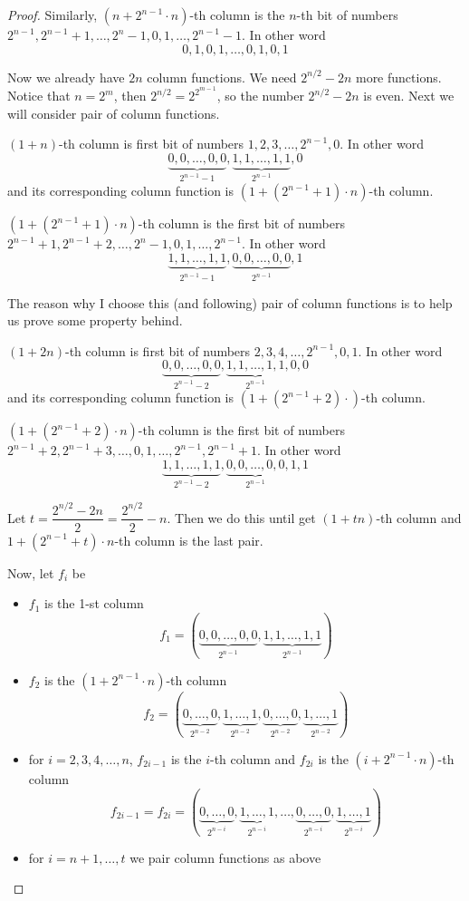\documentclass{article}
\begin{document}
\begin{proof}
    Similarly, $(n+2^{n-1} \cdot n)$-th column is the $n$-th bit of numbers $2^{n-1}, 2^{n-1}+1, \ldots, 2^n-1, 0, 1, \ldots, 2^{n-1}-1$. In other word \[ 0, 1, 0, 1, \ldots, 0, 1, 0, 1 \]

    Now we already have $2n$ column functions. We need $2^{n/2}-2n$ more functions. Notice that $n=2^m$, then $2^{n/2} = 2^{2^{m-1}}$, so the number $2^{n/2}-2n$ is even. Next we will consider pair of column functions.

    $(1+n)$-th column is first bit of numbers $1, 2, 3, \ldots, 2^{n-1}, 0$. In other word \[ \underbrace{0, 0, \ldots, 0, 0}_{2^{n-1}-1}, \underbrace{1, 1, \ldots, 1, 1}_{2^{n-1}}, 0 \] and its corresponding column function is $(1 + (2^{n-1}+1) \cdot n)$-th column.

    $(1 + (2^{n-1} + 1) \cdot n)$-th column is the first bit of numbers $2^{n-1}+1, 2^{n-1}+2, \ldots, 2^n-1, 0, 1, \ldots, 2^{n-1}$. In other word \[ \underbrace{1, 1, \ldots, 1, 1}_{2^{n-1}-1}, \underbrace{0, 0, \ldots, 0, 0}_{2^{n-1}}, 1 \]

    The reason why I choose this (and following) pair of column functions is to help us prove some property behind.

    $(1 + 2n)$-th column is first bit of numbers $2, 3, 4, \ldots, 2^{n-1}, 0, 1$. In other word \[ \underbrace{0, 0, \ldots, 0, 0}_{2^{n-1}-2}, \underbrace{1, 1, \ldots, 1, 1}_{2^{n-1}}, 0, 0 \] and its corresponding column function is $(1 + (2^{n-1} + 2) \cdot)$-th column.

    $(1 + (2^{n-1}+2) \cdot n)$-th column is the first bit of numbers $2^{n-1}+2, 2^{n-1}+3, \ldots, 0, 1, \ldots, 2^{n-1}, 2^{n-1}+1$. In other word \[ \underbrace{1, 1, \ldots, 1, 1}_{2^{n-1}-2}, \underbrace{0, 0, \ldots, 0, 0}_{2^{n-1}}, 1, 1 \]

    Let $t = \dfrac{2^{n/2} - 2n}{2} = \dfrac{2^{n/2}}{2} - n$. Then we do this until get $(1 + tn)$-th column and $1 + (2^{n-1}+t) \cdot n$-th column is the last pair.

    Now, let $f_i$ be

    \begin{itemize}
        \item $f_1$ is the 1-st column \[ f_1 = (\underbrace{0, 0, \ldots, 0, 0}_{2^{n-1}}, \underbrace{1, 1, \ldots, 1, 1}_{2^{n-1}}) \]
        \item $f_2$ is the $(1 + 2^{n-1} \cdot n)$-th column \[ f_2 = (\underbrace{0, \ldots, 0}_{2^{n-2}}, \underbrace{1, \ldots, 1}_{2^{n-2}}, \underbrace{0, \ldots, 0}_{2^{n-2}}, \underbrace{1, \ldots, 1}_{2^{n-2}}) \]
        \item for $i = 2, 3, 4, \ldots, n$, $f_{2i-1}$ is the $i$-th column and $f_{2i}$ is the $(i + 2^{n-1} \cdot n)$-th column \[ f_{2i-1} = f_{2i} = (\underbrace{0, \ldots, 0}_{2^{n-i}}, \underbrace{1, \ldots, 1}_{2^{n-i}}, \ldots, \underbrace{0, \ldots, 0}_{2^{n-i}}, \underbrace{1, \ldots, 1}_{2^{n-i}}) \]
        \item for $i = n+1, \ldots, t$ we pair column functions as above
    \end{itemize}


\end{proof}
\end{document}
